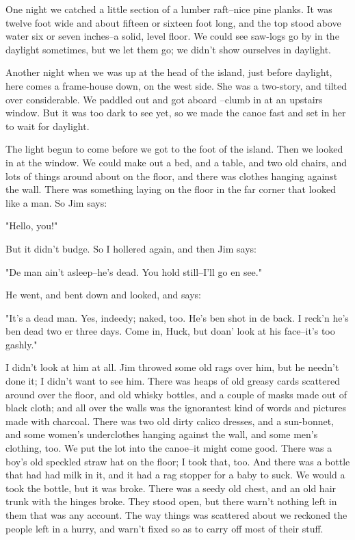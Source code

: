 One night we catched a little section of a lumber raft--nice pine planks.
It was twelve foot wide and about fifteen or sixteen foot long, and the
top stood above water six or seven inches--a solid, level floor.  We
could see saw-logs go by in the daylight sometimes, but we let them go;
we didn't show ourselves in daylight.

Another night when we was up at the head of the island, just before
daylight, here comes a frame-house down, on the west side.  She was a
two-story, and tilted over considerable.  We paddled out and got aboard
--clumb in at an upstairs window.  But it was too dark to see yet, so we
made the canoe fast and set in her to wait for daylight.

The light begun to come before we got to the foot of the island.  Then we
looked in at the window.  We could make out a bed, and a table, and two
old chairs, and lots of things around about on the floor, and there was
clothes hanging against the wall.  There was something laying on the
floor in the far corner that looked like a man.  So Jim says:

"Hello, you!"

But it didn't budge.  So I hollered again, and then Jim says:

"De man ain't asleep--he's dead.  You hold still--I'll go en see."

He went, and bent down and looked, and says:

"It's a dead man.  Yes, indeedy; naked, too.  He's ben shot in de back.
I reck'n he's ben dead two er three days.  Come in, Huck, but doan' look
at his face--it's too gashly."

I didn't look at him at all.  Jim throwed some old rags over him, but he
needn't done it; I didn't want to see him.  There was heaps of old greasy
cards scattered around over the floor, and old whisky bottles, and a
couple of masks made out of black cloth; and all over the walls was the
ignorantest kind of words and pictures made with charcoal.  There was two
old dirty calico dresses, and a sun-bonnet, and some women's underclothes
hanging against the wall, and some men's clothing, too.  We put the lot
into the canoe--it might come good.  There was a boy's old speckled straw
hat on the floor; I took that, too.  And there was a bottle that had had
milk in it, and it had a rag stopper for a baby to suck.  We would a took
the bottle, but it was broke.  There was a seedy old chest, and an old
hair trunk with the hinges broke.  They stood open, but there warn't
nothing left in them that was any account.  The way things was scattered
about we reckoned the people left in a hurry, and warn't fixed so as to
carry off most of their stuff.

